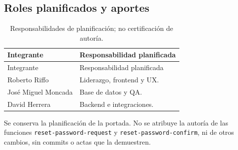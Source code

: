 \documentclass[11pt,a4paper]{article}
\begin{document}
\subsection{Roles planificados y aportes}
\begin{longtable}{p{4cm}p{9.7cm}}
\caption{Responsabilidades de planificación; no certificación de autoría.}\label{tab:aportes}\\
\toprule Integrante & Responsabilidad planificada \\\midrule\endfirsthead
\toprule Integrante & Responsabilidad planificada \\\midrule\endhead
Roberto Riffo & Liderazgo, frontend y UX. \\
José Miguel Moncada & Base de datos y QA. \\
David Herrera & Backend e integraciones. \\
\bottomrule\end{longtable}
Se conserva la planificación de la portada. No se atribuye la autoría de las funciones
\texttt{reset-password-request} y \texttt{reset-password-confirm}, ni de otros cambios,
sin commits o actas que la demuestren.
\end{document}
